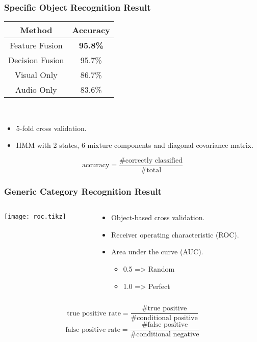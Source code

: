 \documentclass{beamer}
\begin{document}
  \begin{frame}
    \frametitle{Specific Object Recognition Result}

    \centering
    \begin{tabular}[h]{c|c}
      \hline
      Method & Accuracy \\ \hline \hline
      Feature Fusion & \textbf{95.8\%} \\ \hline
      Decision Fusion  & 95.7\% \\ \hline
      Visual Only & 86.7\% \\ \hline
      Audio Only & 83.6\% \\ \hline
    \end{tabular}
    
    ~
    \begin{itemize}
      \item 5-fold cross validation.
      \item HMM with 2 states, 6 mixture components and diagonal covariance matrix.
    \end{itemize}
    \vfill
    {\scriptsize
      \[ \text{accuracy} =  \frac{\text{\# correctly classified}}{\text{\# total}} \]
    }
  \end{frame}

  \begin{frame}
    \frametitle{Generic Category Recognition Result}
    
    \begin{columns}
      \begin{column}{.5\textwidth}
        \centering
        \scriptsize
        \texttt{[image: roc.tikz]}
      \end{column}
      \begin{column}{.5\textwidth}
        \begin{itemize}
          \item Object-based cross validation.
          \item Receiver operating characteristic (ROC).
          \item Area under the curve (AUC).
            \begin{itemize}
              \item 0.5 => Random
              \item 1.0 => Perfect 
            \end{itemize}
        \end{itemize}
      \end{column}
    \end{columns}
    {\scriptsize
      \[ \text{true positive rate} =  \frac{\text{\# true positive}}{\text{\# conditional positive}} \]
      \[ \text{false positive rate} =  \frac{\text{\# false positive}}{\text{\# conditional negative}} \]
    }
  \end{frame}
\end{document}
